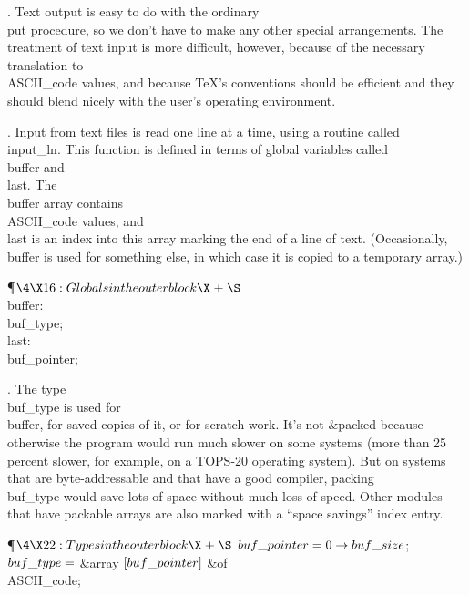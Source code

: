 .
Text output is easy to do with the ordinary \PASCAL\ \\{put} procedure,
so we don't have to make any other special arrangements.
The treatment of text input is more difficult, however, because
of the necessary translation to \\{ASCII\_code} values, and because
\TeX's conventions should be efficient and they should
blend nicely with the user's operating environment.


\fi

.
Input from text files is read one line at a time, using a routine
called \\{input\_ln}. This function is defined in terms of global
variables called \\{buffer} and \\{last}.  The \\{buffer} array contains
\\{ASCII\_code} values, and \\{last} is an index into this array marking
the end of a line of text.  (Occasionally, \\{buffer} is used for
something else, in which case it is copied to a temporary array.)

\Y\P$\4\X16:Globals in the outer block\X\mathrel{+}\S$\6
\4\\{buffer}: \\{buf\_type};\6
\4\\{last}: \\{buf\_pointer};\par
\fi

.
The type \\{buf\_type} is used for \\{buffer}, for saved copies of it, or
for scratch work.  It's not \&{packed}  because otherwise the program
would run much slower on some systems (more than 25 percent slower,
for example, on a TOPS-20 operating system).  But on systems that are
byte-addressable and that have a good compiler, packing \\{buf\_type}
would save lots of space without much loss of speed.  Other modules
that have packable arrays are also marked with a ``space savings''
index entry.

\Y\P$\4\X22:Types in the outer block\X\mathrel{+}\S$\6
$\\{buf\_pointer}=0\to\\{buf\_size}$;\6
$\\{buf\_type}=$\1\5
\&{array} $[\\{buf\_pointer}]$ \1\&{of}\5
\\{ASCII\_code};\2\2\par
\fi

